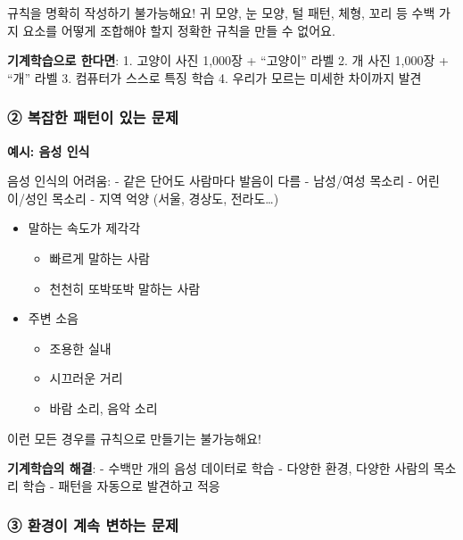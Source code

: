 \documentclass[a4paper, 11pt]{article}
\providecommand{\tightlist}{%
  \setlength{\itemsep}{0pt}\setlength{\parskip}{0pt}}
\begin{document}
규칙을 명확히 작성하기 불가능해요! 귀 모양, 눈 모양, 털 패턴, 체형, 꼬리
등 수백 가지 요소를 어떻게 조합해야 할지 정확한 규칙을 만들 수 없어요.

\textbf{기계학습으로 한다면}: 1. 고양이 사진 1,000장 + ``고양이'' 라벨
2. 개 사진 1,000장 + ``개'' 라벨 3. 컴퓨터가 스스로 특징 학습 4. 우리가
모르는 미세한 차이까지 발견

\hypertarget{uxbcf5uxc7a1uxd55c-uxd328uxd134uxc774-uxc788uxb294-uxbb38uxc81c}{%
\subsubsection{\textbf{②} 복잡한 패턴이 있는
문제}\label{uxbcf5uxc7a1uxd55c-uxd328uxd134uxc774-uxc788uxb294-uxbb38uxc81c}}

\textbf{예시: 음성 인식}

음성 인식의 어려움: - 같은 단어도 사람마다 발음이 다름 - 남성/여성
목소리 - 어린이/성인 목소리 - 지역 억양 (서울, 경상도, 전라도\ldots)

\begin{itemize}
\tightlist
\item
  말하는 속도가 제각각

  \begin{itemize}
  \tightlist
  \item
    빠르게 말하는 사람
  \item
    천천히 또박또박 말하는 사람
  \end{itemize}
\item
  주변 소음

  \begin{itemize}
  \tightlist
  \item
    조용한 실내
  \item
    시끄러운 거리
  \item
    바람 소리, 음악 소리
  \end{itemize}
\end{itemize}

이런 모든 경우를 규칙으로 만들기는 불가능해요!

\textbf{기계학습의 해결}: - 수백만 개의 음성 데이터로 학습 - 다양한
환경, 다양한 사람의 목소리 학습 - 패턴을 자동으로 발견하고 적응

\hypertarget{uxd658uxacbduxc774-uxacc4uxc18d-uxbcc0uxd558uxb294-uxbb38uxc81c}{%
\subsubsection{\textbf{③} 환경이 계속 변하는
문제}\label{uxd658uxacbduxc774-uxacc4uxc18d-uxbcc0uxd558uxb294-uxbb38uxc81c}}
\end{document}

